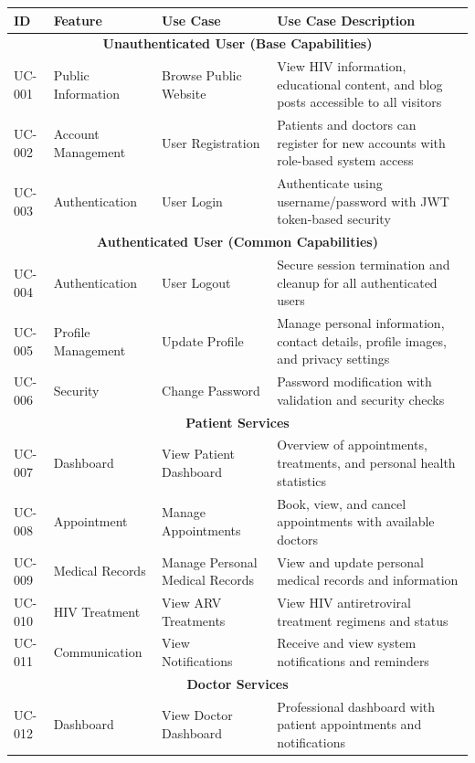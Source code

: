 \documentclass[12pt,a4paper]{article}
\begin{document}
\begin{longtable}{|p{1cm}|p{3cm}|p{3cm}|p{7cm}|}
\hline
\textbf{ID} & \textbf{Feature} & \textbf{Use Case} & \textbf{Use Case Description} \\
\hline
\multicolumn{4}{|c|}{\textbf{Unauthenticated User (Base Capabilities)}} \\
\hline
UC-001 & Public Information & Browse Public Website & View HIV information, educational content, and blog posts accessible to all visitors \\
\hline
UC-002 & Account Management & User Registration & Patients and doctors can register for new accounts with role-based system access \\
\hline
UC-003 & Authentication & User Login & Authenticate using username/password with JWT token-based security \\
\hline
\multicolumn{4}{|c|}{\textbf{Authenticated User (Common Capabilities)}} \\
\hline
UC-004 & Authentication & User Logout & Secure session termination and cleanup for all authenticated users \\
\hline
UC-005 & Profile Management & Update Profile & Manage personal information, contact details, profile images, and privacy settings \\
\hline
UC-006 & Security & Change Password & Password modification with validation and security checks \\
\hline
\multicolumn{4}{|c|}{\textbf{Patient Services}} \\
\hline
UC-007 & Dashboard & View Patient Dashboard & Overview of appointments, treatments, and personal health statistics \\
\hline
UC-008 & Appointment & Manage Appointments & Book, view, and cancel appointments with available doctors \\
\hline
UC-009 & Medical Records & Manage Personal Medical Records & View and update personal medical records and information \\
\hline
UC-010 & HIV Treatment & View ARV Treatments & View HIV antiretroviral treatment regimens and status \\
\hline
UC-011 & Communication & View Notifications & Receive and view system notifications and reminders \\
\hline
\multicolumn{4}{|c|}{\textbf{Doctor Services}} \\
\hline
UC-012 & Dashboard & View Doctor Dashboard & Professional dashboard with patient appointments and notifications \\

\end{longtable}
\end{document}
